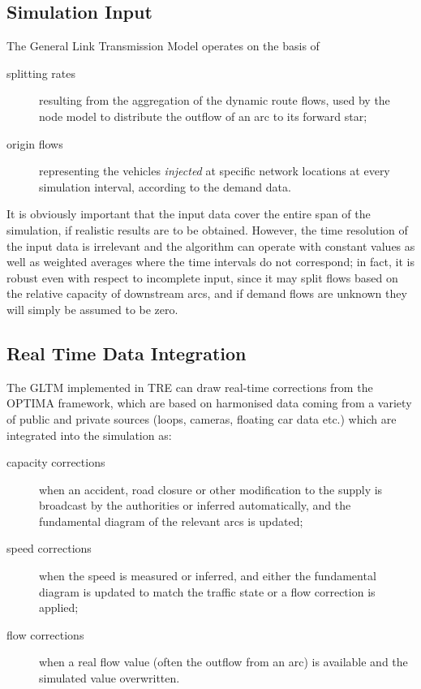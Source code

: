 
\subsection{Simulation Input}
The General Link Transmission Model operates on the basis of
\begin{description}
\item[splitting rates] resulting from the aggregation of the dynamic route flows, used by the node model to distribute the outflow of an arc to its forward star;
\item[origin flows] representing the vehicles \emph{injected} at specific network locations at every simulation interval, according to the demand data.
\end{description}

It is obviously important that the input data cover the entire span of the simulation, if realistic results are to be obtained.
However, the time resolution of the input data is irrelevant and the algorithm can operate with constant values as well as weighted averages where the time intervals do not correspond; in fact, it is robust even with respect to incomplete input, since it may split flows based on the relative capacity of downstream arcs, and if demand flows are unknown they will simply be assumed to be zero.


\subsection{Real Time Data Integration}
The GLTM implemented in TRE can draw real-time corrections from the OPTIMA framework, which are based on harmonised data coming from a variety of public and private sources (loops, cameras, floating car data etc.) which are integrated into the simulation as:
\begin{description}
\item[capacity corrections] when an accident, road closure or other modification to the supply is broadcast by the authorities or inferred automatically, and the fundamental diagram of the relevant arcs is updated;
\item[speed corrections] when the speed is measured or inferred, and either the fundamental diagram is updated to match the traffic state or a flow correction is applied;
\item[flow corrections] when a real flow value (often the outflow from an arc) is available and the simulated value overwritten.
\end{description}

